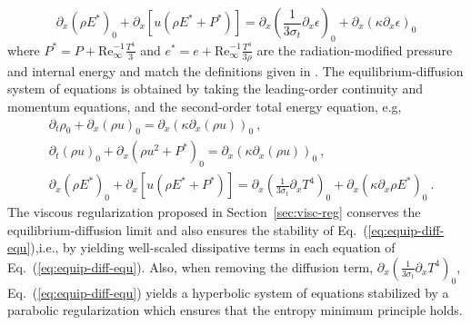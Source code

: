 \documentclass[review]{elsarticle}
\newcommand{\eqt}[1]{Eq.~(\ref{#1})}                     %
\newcommand{\sect}[1]{Section~\ref{#1}}                     %
\renewcommand{\Re}{\textrm{Re}}
\begin{document}
%
\begin{equation}
\partial_x \left( \rho E^* \right)_0 + \partial_x \left[ u \left( \rho E^* + P^* \right) \right] = \partial_x \left( \frac{1}{3 \sigma_t} \partial_x \epsilon \right)_0 + \partial_x \left( \kappa \partial_x \epsilon \right)_0 \nonumber
\end{equation}
%
where $P^* = P + \Re_\infty^{-1} \frac{T^4}{3}$ and $e^* = e + \Re_\infty^{-1} \frac{T^4}{3 \rho}$ are the radiation-modified pressure and internal energy and match the definitions given in \cite{LowrieMorel}. The equilibrium-diffusion system of equations is obtained by taking the leading-order continuity and momentum equations, and the second-order total energy equation, e.g,
%
\begin{align}\label{eq:equip-diff-equ}
&\partial_t \rho_0 + \partial_x \left( \rho u \right)_0 = \partial_x \left( \kappa \partial_x \left( \rho u \right)\right)_0 \nonumber \ ,\\
&\partial_t \left( \rho u \right)_0 + \partial_x \left( \rho u^2 + P^* \right)_0 = \partial_x \left( \kappa \partial_x \left( \rho u \right) \right)_0  \ , \\
&\partial_x \left( \rho E^* \right)_0 + \partial_x \left[ u \left( \rho E^* + P^* \right) \right] = \partial_x \left( \frac{1}{3 \sigma_t} \partial_x T^4 \right)_0 + \partial_x \left( \kappa \partial_x \rho E^* \right)_0 \ . \nonumber
\end{align}
%
The viscous regularization proposed in \sect{sec:visc-reg} conserves the equilibrium-diffusion limit and also ensures the stability of \eqt{eq:equip-diff-equ},i.e., by yielding well-scaled dissipative terms in each equation of \eqt{eq:equip-diff-equ}. Also, when removing the diffusion term, $\partial_x \left( \frac{1}{3 \sigma_t} \partial_x T^4 \right)_0$, \eqt{eq:equip-diff-equ} yields a hyperbolic system of equations stabilized by a parabolic regularization \cite{Parabolic} which ensures that the entropy minimum principle holds. 
\end{document}
